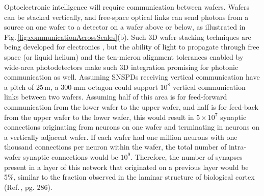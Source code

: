 \documentclass[twocolumn]{article}
\begin{document}
\begin{figure} 
\end{figure}
Optoelectronic intelligence will require communication between wafers. Wafers can be stacked vertically, and free-space optical links can send photons from a source on one wafer to a detector on a wafer above or below, as illustrated in Fig.\,\ref{fig:communicationAcrossScales}(b). Such 3D wafer-stacking techniques are being developed for electronics \cite{sani2018}, but the ability of light to propagate through free space (or liquid helium) and the ten-micron alignment tolerances enabled by wide-area photodetectors \cite{mave2013} make such 3D integration promising for photonic communication as well. Assuming SNSPDs receiving vertical communication have a pitch of 25\,\textmu m, a 300-mm octagon could support $10^8$ vertical communication links between two wafers. Assuming half of this area is for feed-forward communication from the lower wafer to the upper wafer, and half is for feed-back from the upper wafer to the lower wafer, this would result in $5\times10^7$ synaptic connections originating from neurons on one wafer and terminating in neurons on a vertically adjacent wafer. If each wafer had one million neurons with one thousand connections per neuron within the wafer, the total number of intra-wafer synaptic connections would be $10^9$. Therefore, the number of synapses present in a layer of this network that originated on a previous layer would be 5\%, similar to the fraction observed in the laminar structure of biological cortex (Ref.\,\cite{bu2006}, pg. 286).
\end{document}
